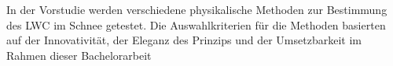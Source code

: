 
In der Vorstudie werden verschiedene physikalische Methoden zur Bestimmung des LWC im Schnee getestet. Die Auswahlkriterien für die Methoden basierten auf der Innovativität, der Eleganz des Prinzips und der Umsetzbarkeit im Rahmen dieser Bachelorarbeit

